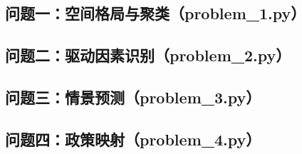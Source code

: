 \documentclass[12pt,a4paper]{ctexart}
\theoremstyle{definition}
\theoremstyle{plain}
\theoremstyle{remark}
\begin{document}
\subsection{问题一：空间格局与聚类（problem\_1.py）}


\subsection{问题二：驱动因素识别（problem\_2.py）}


\subsection{问题三：情景预测（problem\_3.py）}


\subsection{问题四：政策映射（problem\_4.py）}

\end{document}
